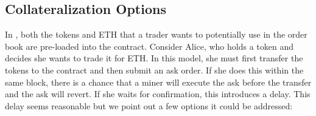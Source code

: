 
\subsection{Collateralization Options}

In \cm, both the tokens and ETH that a trader wants to potentially use in the order book are pre-loaded into the contract. Consider Alice, who holds a token and decides she wants to trade it for ETH. In this model, she must first transfer the tokens to the contract and then submit an ask order. If she does this within the same block, there is a chance that a miner will execute the ask before the transfer and the ask will revert. If she waits for confirmation, this introduces a delay. This delay seems reasonable but we point out a few options it could be addressed: 

